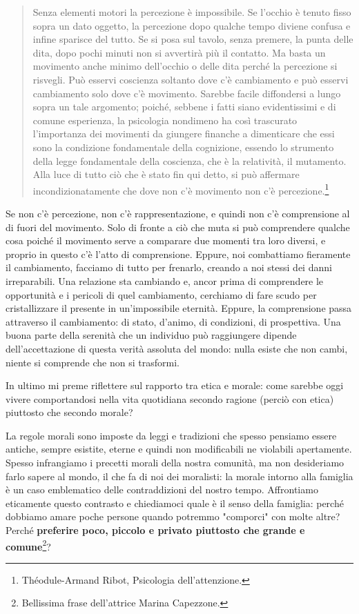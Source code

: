 \begin{quotation}
	\small Senza elementi motori la percezione è impossibile. Se l’occhio è tenuto fisso sopra un dato oggetto, la percezione dopo qualche tempo diviene confusa e infine sparisce del tutto. Se si posa sul tavolo, senza premere, la punta delle dita, dopo pochi minuti non si avvertirà più il contatto. Ma basta un movimento anche minimo dell’occhio o delle dita perché la percezione si risvegli. Può esservi coscienza soltanto dove c’è cambiamento e può esservi cambiamento solo dove c’è movimento. Sarebbe facile diffondersi a lungo sopra un tale argomento; poiché, sebbene i fatti siano evidentissimi e di comune esperienza, la psicologia nondimeno ha così trascurato l’importanza dei movimenti da giungere finanche a dimenticare che essi sono la condizione fondamentale della cognizione, essendo lo strumento della legge fondamentale della coscienza, che è la relatività, il mutamento. Alla luce di tutto ciò che è stato fin qui detto, si può affermare incondizionatamente che dove non c’è movimento non c’è percezione.\footnote{Théodule-Armand Ribot, Psicologia dell'attenzione.}
\end{quotation}

Se  non c'è percezione, non c'è rappresentazione, e quindi non c'è comprensione al di fuori del movimento. Solo di fronte a ciò che muta si può comprendere qualche cosa poiché il movimento serve a comparare due momenti tra loro diversi, e proprio in questo c'è l'atto di comprensione. Eppure, noi combattiamo fieramente il cambiamento, facciamo di tutto per frenarlo, creando a noi stessi dei danni irreparabili. Una relazione sta cambiando e, ancor prima di comprendere le opportunità e i pericoli di quel cambiamento, cerchiamo di fare scudo per cristallizzare il presente in un'impossibile eternità. Eppure, la comprensione passa attraverso il cambiamento: di stato, d'animo, di condizioni, di prospettiva. Una buona parte della serenità che un individuo può raggiungere dipende dell'accettazione di questa verità assoluta del mondo: nulla esiste che non cambi, niente si comprende che non si trasformi.

In ultimo mi preme riflettere sul rapporto tra etica e morale: come sarebbe oggi vivere comportandosi nella vita quotidiana secondo ragione (perciò con etica) piuttosto che secondo morale?

La regole morali sono imposte da leggi e tradizioni che spesso pensiamo essere antiche, sempre esistite, eterne e quindi non modificabili ne violabili apertamente. Spesso infrangiamo i precetti morali della nostra comunità, ma non desideriamo farlo sapere al mondo, il che fa di noi dei moralisti: la morale intorno alla famiglia è un caso emblematico delle contraddizioni del nostro tempo.
Affrontiamo eticamente questo contrasto e chiediamoci quale è il senso della famiglia: perché dobbiamo amare poche persone quando  potremmo "comporci" con molte altre? Perché \textbf{preferire poco, piccolo e privato piuttosto che grande e comune}\footnote{Bellissima frase dell'attrice Marina Capezzone.}?

